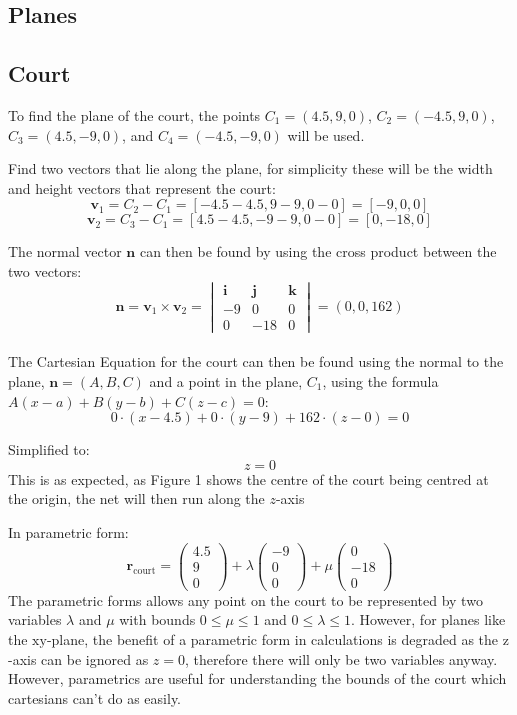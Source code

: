 \documentclass{article}
\begin{document}
\subsection*{Planes}

\subsection*{Court}

To find the plane of the court, the points \(C_1 = (4.5, 9, 0)\), \(C_2 = (-4.5, 9, 0)\), \(C_3 = (4.5, -9, 0)\), and \(C_4 = (-4.5, -9, 0)\) will be used. \vspace{15pt}

Find two vectors that lie along the plane, for simplicity these will be the width and height vectors that represent the court:
\[\mathbf{v}_1 = C_2 - C_1 = [-4.5 - 4.5, 9 - 9, 0 - 0] = [-9, 0, 0]\]
\[\mathbf{v}_2 = C_3 - C_1 = [4.5 - 4.5, -9 - 9, 0 - 0] = [0, -18, 0]\]
\vspace{15pt}

The normal vector \(\mathbf{n}\) can then be found by using the cross product between the two vectors:
\[\mathbf{n} = \mathbf{v}_1 \times \mathbf{v}_2 = 
	\begin{vmatrix}\mathbf{i} & \mathbf{j} & \mathbf{k} \\ -9 & 0 & 0 \\ 0 & -18 & 0 \end{vmatrix} = (0, 0, 162)\]
	\\ 
	The Cartesian Equation for the court can then be found using the normal to the plane, \(\mathbf{n} = (A, B, C)\) and a point in the plane, \(C_1\), using the formula \(A(x-a) + B(y-b) + C(z-c) = 0\):
	\[0 \cdot (x - 4.5) + 0 \cdot (y - 9) + 162 \cdot (z - 0) = 0\]

	Simplified to:
	\[z = 0\]
	This is as expected, as Figure 1 shows the centre of the court being centred at the origin, the net will then run along the \(z\)-axis \vspace{15pt}

	In parametric form: \vspace{15pt}
	\[\mathbf{r}_{\text{court}} = \begin{pmatrix} 4.5 \\ 9 \\ 0 \end{pmatrix} + \lambda \begin{pmatrix} -9 \\ 0 \\ 0 \end{pmatrix} + \mu \begin{pmatrix} 0 \\ -18 \\ 0 \end{pmatrix} \]
	The parametric forms allows any point on the court to be represented by two variables $\lambda$ and $\mu$ with bounds \(0 \le \mu \le 1\) and \(0 \le \lambda \le 1\). However, for planes like the \(\mathrm{x}\mathrm{y}\)-plane, the benefit of a parametric form in calculations is degraded as the \(\mathrm{z}\)-axis can be ignored as \(z = 0\), therefore there will only be two variables anyway. However, parametrics are useful for understanding the bounds of the court which cartesians can't do as easily.
\end{document}
